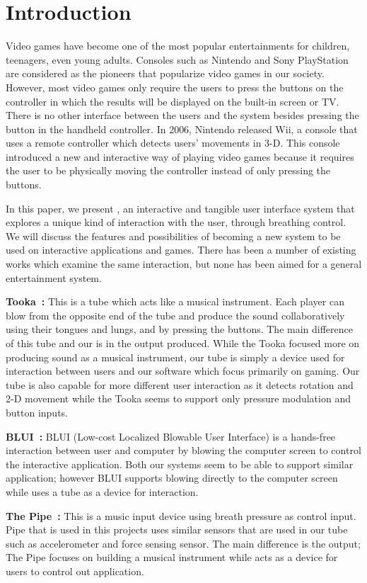 \section{Introduction}\label{sec:intro}

Video games have become one of the most popular entertainments for children, teenagers, even young adults. Consoles such as Nintendo and Sony PlayStation are considered as the pioneers that popularize video games in our society. However, most video games only require the users to press the buttons on the controller in which the results will be displayed on the built-in screen or TV. There is no other interface between the users and the system besides pressing the button in the handheld controller. In 2006, Nintendo released Wii, a console that uses a remote controller which detects users’ movements in 3-D. This console introduced a new and interactive way of playing video games because it requires the user to be physically moving the controller instead of only pressing the buttons.

In this paper, we present \tube, an interactive and tangible user interface system that explores a unique kind of interaction with the user, \ie through breathing control. We will discuss the features and possibilities of \tube becoming a new system to be used on interactive applications and games. There has been a number of existing works which examine the same interaction, but none has been aimed for a general entertainment system.

\textbf{Tooka~\cite{tooka}:} This is a tube which acts like a musical instrument. Each player can blow from the opposite end of the tube and produce the sound collaboratively using their tongues and lungs, and by pressing the buttons. The main difference of this tube and our \tube is in the output produced. While the Tooka focused more on producing sound as a musical instrument, our tube is simply a device used for interaction between users and our software which focus primarily on gaming. Our tube is also capable for more different user interaction as it detects rotation and 2-D movement while the Tooka seems to support only pressure modulation and button inputs.

\textbf{BLUI~\cite{blui}:} BLUI (Low-cost Localized Blowable User Interface) is a hands-free interaction between user and computer by blowing the computer screen to control the interactive application. Both our systems seem to be able to support similar application; however BLUI supports blowing directly to the computer screen while \tube uses a tube as a device for interaction.

\textbf{The Pipe~\cite{thepipe}:} This is a music input device using breath pressure as control input. Pipe that is used in this projects uses similar sensors that are used in our tube such as accelerometer and force sensing sensor. The main difference is the output; The Pipe focuses on building a musical instrument while \tube acts as a device for users to control out application.
